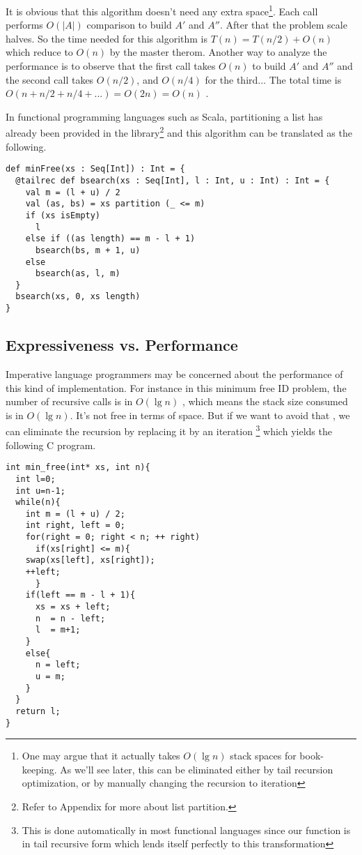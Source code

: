 \documentclass{article}
\begin{document}
It is obvious that this algorithm doesn't need any extra
space\footnote{One may argue that it
actually takes $O(\lg n)$ stack spaces for book-keeping. As
we'll see later, this can be eliminated either by tail
recursion optimization, or by manually
changing the recursion to iteration}. Each call
performs $O(|A|)$ comparison to build $A'$ and $A''$.
After that the problem scale halves.
So the time needed for this algorithm is $T(n) = T(n/2) + O(n)$
which reduce to $O(n)$ by the master therom. Another way to analyze the performance
is to observe that the first call takes $O(n)$
to build $A'$ and $A''$ and the second call takes
$O(n/2)$, and $O(n/4)$ for the third... The total
time is $O(n + n/2 + n/4 + ...) = O(2n) = O(n)$ .

In functional programming languages such as Scala,
partitioning a list has already been provided in the library\footnote{Refer to Appendix for more about list partition.}
and this algorithm can be translated as the following.

\lstset{language=Scala}
\begin{lstlisting}
def minFree(xs : Seq[Int]) : Int = {
  @tailrec def bsearch(xs : Seq[Int], l : Int, u : Int) : Int = {
    val m = (l + u) / 2
    val (as, bs) = xs partition (_ <= m)
    if (xs isEmpty)
      l
    else if ((as length) == m - l + 1)
      bsearch(bs, m + 1, u)
    else
      bsearch(as, l, m)
  }
  bsearch(xs, 0, xs length)
}
\end{lstlisting}

\subsection{Expressiveness vs. Performance}
Imperative language programmers may be concerned about the performance
of this kind of implementation. For instance in this minimum
free ID problem, the number of recursive calls is in $O(\lg n)$
, which means the stack size consumed is in $O(\lg n)$.
It's not free in terms of space. But if we want to avoid that
, we can eliminate the recursion by replacing it by an iteration
\footnote{This is done automatically in most functional languages
since our function is in tail recursive form which lends itself
perfectly to this transformation} which yields the following C program.

\lstset{language=C}
\begin{lstlisting}
int min_free(int* xs, int n){
  int l=0;
  int u=n-1;
  while(n){
    int m = (l + u) / 2;
    int right, left = 0;
    for(right = 0; right < n; ++ right)
      if(xs[right] <= m){
	swap(xs[left], xs[right]);
	++left;
      }
    if(left == m - l + 1){
      xs = xs + left;
      n  = n - left;
      l  = m+1;
    }
    else{
      n = left;
      u = m;
    }
  }
  return l;
}
\end{lstlisting}
\end{document}
